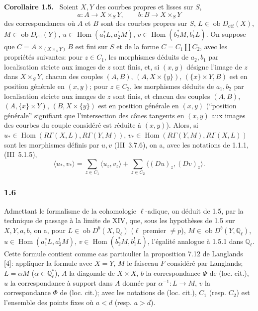 \documentclass[11pt]{article}
\newenvironment{statement}[1]{\par\medskip\noindent\textbf{#1.}\ }{\par\medskip}
\DeclareMathOperator{\Hom}{Hom}
\newcommand{\ob}{\operatorname{ob}}
\providecommand{\ctf}{\mathrm{ctf}}
\providecommand{\Hom}{\operatorname{Hom}}
\providecommand{\ob}{\operatorname{ob}}
\providecommand{\Hom}{\operatorname{Hom}}
\begin{document}
\begin{statement}{Corollaire 1.5}
Soient $X,Y$ des courbes propres et lisses sur $S$,
\[
a:A\longrightarrow X\times_S Y,
\qquad
b:B\longrightarrow X\times_S Y
\]
des correspondances où $A$ et $B$ sont des courbes propres sur $S$, $L\in\ob D_{\ctf}(X)$, $M\in\ob D_{\ctf}(Y)$, $u\in\Hom(a_1^*L,a_2^!M)$, $v\in\Hom(b_2^*M,b_1^!L)$. On suppose que $C=A\times_{(X\times_S Y)}B$ est fini sur $S$ et de la forme $C=C_1\amalg C_2$, avec les propriétés suivantes: pour $z\in C_1$, les morphismes déduits de $a_2,b_1$ par localisation stricte aux images de $z$ sont finis, et, si $(x,y)$ désigne l'image de $z$ dans $X\times_S Y$, chacun des couples $(A,B)$, $(A,X\times\{y\})$, $(\{x\}\times Y,B)$ est en position générale en $(x,y)$; pour $z\in C_2$, les morphismes déduits de $a_1,b_2$ par localisation stricte aux images de $z$ sont finis, et chacun des couples $(A,B)$, $(A,\{x\}\times Y)$, $(B,X\times\{y\})$ est en position générale en $(x,y)$ (``position générale'' signifiant que l'intersection des cônes tangents en $(x,y)$ aux images des courbes du couple considéré est réduite à $(x,y)$). Alors, si $u_*\in\Hom(R\Gamma(X,L),R\Gamma(Y,M))$, $v_*\in\Hom(R\Gamma(Y,M),R\Gamma(X,L))$ sont les morphismes définis par $u,v$ (III~3.7.6), on a, avec les notations de 1.1.1, (III~5.1.5),
\begin{equation}\tag{1.5.1}
\langle u_*,v_*\rangle=\sum_{z\in C_1}\langle u_z,v_z\rangle+\sum_{z\in C_2}\langle (Du)_z,(Dv)_z\rangle.
\end{equation}
\end{statement}

\subsubsection*{1.6}
Admettant le formalisme de la cohomologie $\ell$-adique, on déduit de 1.5, par la technique de passage à la limite de XIV, que, sous les hypothèses de 1.5 sur $X,Y,a,b$, on a, pour $L\in\ob D^b(X,\mathbb Q_\ell)$ ($\ell$ premier $\ne p$), $M\in\ob D^b(Y,\mathbb Q_\ell)$, $u\in\Hom(a_1^*L,a_2^!M)$, $v\in\Hom(b_2^*M,b_1^!L)$, l'égalité analogue à 1.5.1 dans $\mathbb Q_\ell$. Cette formule contient comme cas particulier la proposition 7.12 de Langlands [4]: appliquer la formule avec $X=Y$, $M$ le faisceau $F$ considéré par Langlands; $L=\alpha M$ ($\alpha\in\mathbb Q_\ell^*$), $A$ la diagonale de $X\times X$, $b$ la correspondance $\Phi$ de (loc. cit.), $u$ la correspondance à support dans $A$ donnée par $\alpha^{-1}:L\to M$, $v$ la correspondance $\Phi$ de (loc. cit.); avec les notations de (loc. cit.), $C_1$ (resp. $C_2$) est l'ensemble des points fixes où $a<d$ (resp. $a>d$).
\end{document}
